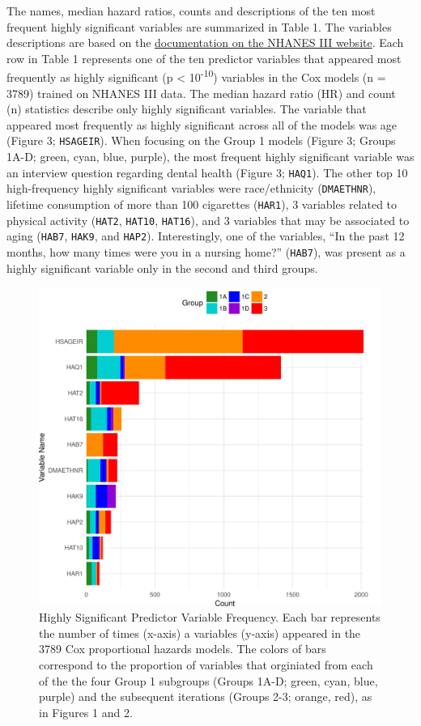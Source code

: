 \documentclass[12pt,oneside]{reedthesis}
\theoremstyle{definition}
\theoremstyle{definition}
\theoremstyle{definition}
\theoremstyle{remark}
\begin{document}
The names, median hazard ratios, counts and descriptions of the ten most
frequent highly significant variables are summarized in Table 1. The
variables descriptions are based on the
\href{https://wwwn.cdc.gov/nchs/nhanes/nhanes3/DataFiles.aspx}{documentation
on the NHANES III website}. Each row in Table 1 represents one of the
ten predictor variables that appeared most frequently as highly
significant (p \textless{} 10\textsuperscript{-10}) variables in the Cox
models (n = 3789) trained on NHANES III data. The median hazard ratio
(HR) and count (n) statistics describe only highly significant
variables. The variable that appeared most frequently as highly
significant across all of the models was age (Figure 3;
\texttt{HSAGEIR}). When focusing on the Group 1 models (Figure 3; Groups
1A-D; green, cyan, blue, purple), the most frequent highly significant
variable was an interview question regarding dental health (Figure 3;
\texttt{HAQ1}). The other top 10 high-frequency highly significant
variables were race/ethnicity (\texttt{DMAETHNR}), lifetime consumption
of more than 100 cigarettes (\texttt{HAR1}), 3 variables related to
physical activity (\texttt{HAT2}, \texttt{HAT10}, \texttt{HAT16}), and 3
variables that may be associated to aging (\texttt{HAB7}, \texttt{HAK9},
and \texttt{HAP2}). Interestingly, one of the variables, ``In the past
12 months, how many times were you in a nursing home?'' (\texttt{HAB7}),
was present as a highly significant variable only in the second and
third groups.
\begin{figure}
\centering
\includegraphics[width=\textwidth,height=0.6\textheight]{figure/3-varbar-final.pdf}
\caption{Highly Significant Predictor Variable Frequency. \break Each
bar represents the number of times (x-axis) a variables (y-axis)
appeared in the 3789 Cox proportional hazards models. The colors of bars
correspond to the proportion of variables that orginiated from each of
the the four Group 1 subgroups (Groups 1A-D; green, cyan, blue, purple)
and the subsequent iterations (Groups 2-3; orange, red), as in Figures 1
and 2.}
\end{figure}
\end{document}
